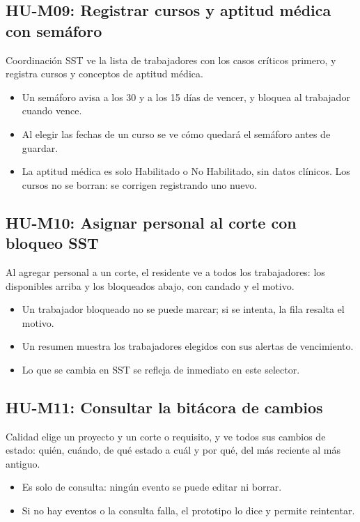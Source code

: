 \documentclass[11pt]{article}
\begin{document}
\subsection*{HU-M09: Registrar cursos y aptitud médica con semáforo}
Coordinación SST ve la lista de trabajadores con los casos críticos primero, y registra cursos y conceptos de aptitud médica.
\begin{itemize}
  \item Un semáforo avisa a los 30 y a los 15 días de vencer, y bloquea al trabajador cuando vence.
  \item Al elegir las fechas de un curso se ve cómo quedará el semáforo antes de guardar.
  \item La aptitud médica es solo Habilitado o No Habilitado, sin datos clínicos. Los cursos no se borran: se corrigen registrando uno nuevo.
\end{itemize}

\subsection*{HU-M10: Asignar personal al corte con bloqueo SST}
Al agregar personal a un corte, el residente ve a todos los trabajadores: los disponibles arriba y los bloqueados abajo, con candado y el motivo.
\begin{itemize}
  \item Un trabajador bloqueado no se puede marcar; si se intenta, la fila resalta el motivo.
  \item Un resumen muestra los trabajadores elegidos con sus alertas de vencimiento.
  \item Lo que se cambia en SST se refleja de inmediato en este selector.
\end{itemize}

\subsection*{HU-M11: Consultar la bitácora de cambios}
Calidad elige un proyecto y un corte o requisito, y ve todos sus cambios de estado: quién, cuándo, de qué estado a cuál y por qué, del más reciente al más antiguo.
\begin{itemize}
  \item Es solo de consulta: ningún evento se puede editar ni borrar.
  \item Si no hay eventos o la consulta falla, el prototipo lo dice y permite reintentar.
\end{itemize}
\end{document}
